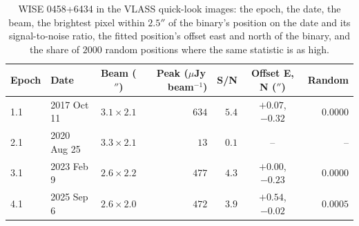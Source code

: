 \documentclass[3p,11pt]{elsarticle}
\newcommand{\uJyb}{$\mu$Jy\,beam$^{-1}$}
\begin{document}
\begin{table}[t]
\centering\small
\caption{WISE 0458+6434 in the VLASS quick-look images: the epoch, the date, the beam,
the brightest pixel within $2.5''$ of the binary's position on the date and its
signal-to-noise ratio, the fitted position's offset east and north of the binary, and
the share of $2000$ random positions where the same statistic is as high.}
\label{tab:vlass}
\begin{tabular}{llcrrcr}
\toprule
Epoch & Date & Beam ($''$) & Peak (\uJyb) & S/N & Offset E, N ($''$) & Random \\
\midrule
1.1 & 2017 Oct 11 & $3.1\times2.1$ & $634$ & $5.4$ & $+0.07$, $-0.32$ & $0.0000$ \\
2.1 & 2020 Aug 25 & $3.3\times2.1$ & $13$ & $0.1$ & -- & -- \\
3.1 & 2023 Feb 9 & $2.6\times2.2$ & $477$ & $4.3$ & $+0.00$, $-0.23$ & $0.0000$ \\
4.1 & 2025 Sep 6 & $2.6\times2.0$ & $472$ & $3.9$ & $+0.54$, $-0.02$ & $0.0005$ \\
\bottomrule
\end{tabular}
\end{table}
\end{document}
